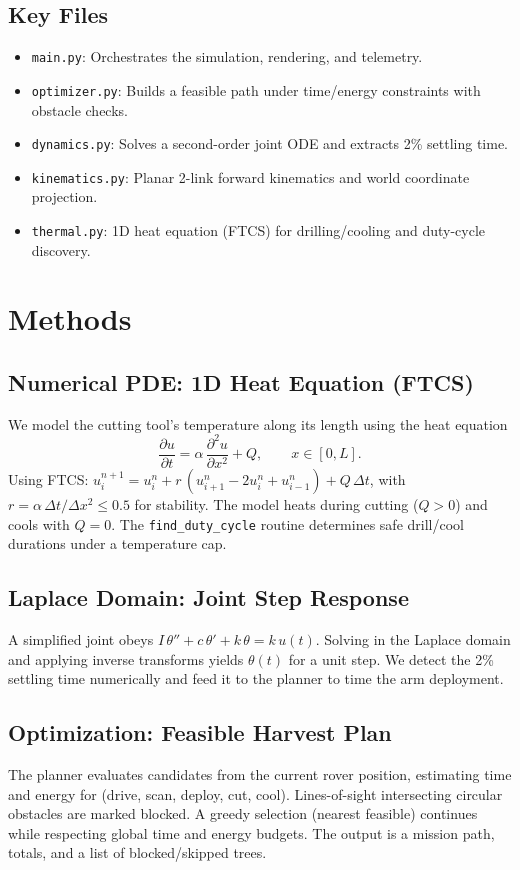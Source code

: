 \documentclass[12pt,a4paper]{report}
\begin{document}
\section{Key Files}
\begin{itemize}[noitemsep]
  \item \texttt{main.py}: Orchestrates the simulation, rendering, and telemetry.
  \item \texttt{optimizer.py}: Builds a feasible path under time/energy constraints with obstacle checks.
  \item \texttt{dynamics.py}: Solves a second-order joint ODE and extracts 2\% settling time.
  \item \texttt{kinematics.py}: Planar 2-link forward kinematics and world coordinate projection.
  \item \texttt{thermal.py}: 1D heat equation (FTCS) for drilling/cooling and duty-cycle discovery.
\end{itemize}

\chapter{Methods}
\section{Numerical PDE: 1D Heat Equation (FTCS)}
We model the cutting tool’s temperature along its length using the heat equation
\begin{equation}
  \frac{\partial u}{\partial t} = \alpha\,\frac{\partial^2 u}{\partial x^2} + Q,\qquad x \in [0,L].
\end{equation}
Using FTCS: \(u^{n+1}_i = u^n_i + r\,(u^n_{i+1}-2u^n_i+u^n_{i-1}) + Q\,\Delta t\), with \(r=\alpha\,\Delta t/\Delta x^2 \le 0.5\) for stability. The model heats during cutting (\(Q>0\)) and cools with \(Q=0\). The \texttt{find\_duty\_cycle} routine determines safe drill/cool durations under a temperature cap.

\section{Laplace Domain: Joint Step Response}
A simplified joint obeys \(I\,\theta'' + c\,\theta' + k\,\theta = k\,u(t)\). Solving in the Laplace domain and applying inverse transforms yields \(\theta(t)\) for a unit step. We detect the 2\% settling time numerically and feed it to the planner to time the arm deployment.

\section{Optimization: Feasible Harvest Plan}
The planner evaluates candidates from the current rover position, estimating time and energy for (drive, scan, deploy, cut, cool). Lines-of-sight intersecting circular obstacles are marked blocked. A greedy selection (nearest feasible) continues while respecting global time and energy budgets. The output is a mission path, totals, and a list of blocked/skipped trees.
\end{document}
